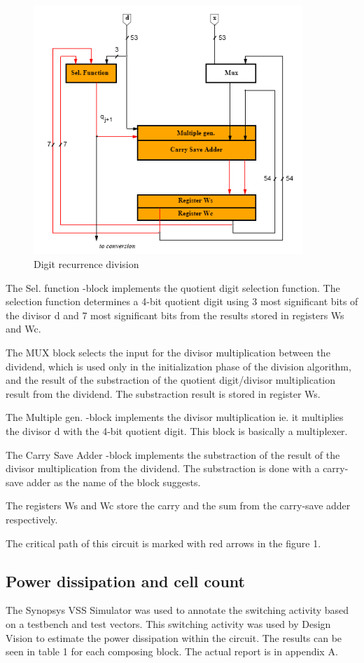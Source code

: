 \documentclass[11pt,a4paper]{article}
\begin{document}
\begin{figure}[!]
	\centering
		\includegraphics[width=4in]{./noretiming.PNG}
	\caption{Digit recurrence division}	\label{fig:noretiming}
\end{figure}


The Sel. function -block implements the quotient digit selection function. The selection function determines a 4-bit quotient digit using 3 most significant bits of the divisor d and 7 most significant bits from the results stored in registers Ws and Wc.

The MUX block selects the input for the divisor multiplication between the dividend, which is used only in the initialization phase of the division algorithm, and the result of the substraction of the quotient digit/divisor multiplication result from the dividend. The substraction result is stored in register Ws.

The Multiple gen. -block implements the divisor multiplication ie. it multiplies the divisor d with the 4-bit quotient digit. This block is basically a multiplexer.

The Carry Save Adder -block implements the substraction of the result of the divisor multiplication from the dividend. The substraction is done with a carry-save adder as the name of the block suggests.

The registers Ws and Wc store the carry and the sum from the carry-save adder respectively.

The critical path of this circuit is marked with red arrows in the figure 1.

\floatbarrier
\subsection{Power dissipation and cell count}
\floatbarrier
The Synopsys VSS Simulator was used to annotate the switching activity based on a testbench and test vectors. This switching activity was used by Design Vision to estimate the power dissipation within the circuit. The results can be seen in table 1 for each composing block. The actual report is in appendix A.
\end{document}
